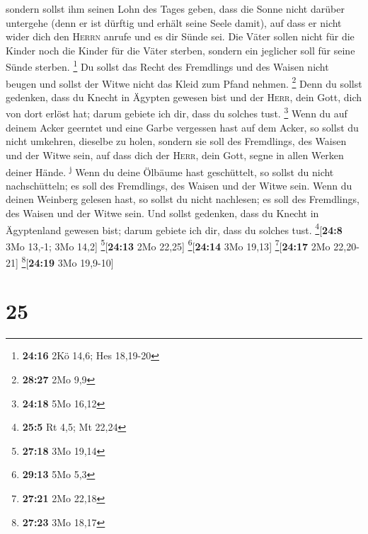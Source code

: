 sondern sollst ihm seinen Lohn des Tages geben, dass die
Sonne nicht darüber untergehe (denn er ist dürftig und erhält seine
Seele damit), auf dass er nicht wider dich den \textsc{Herrn} anrufe und
es dir Sünde sei.  Die Väter sollen nicht für die Kinder
noch die Kinder für die Väter sterben, sondern ein jeglicher soll für
seine Sünde sterben. \footnote{\textbf{24:16} 2Kö 14,6; Hes 18,19-20}
 Du sollst das Recht des Fremdlings und des Waisen nicht
beugen und sollst der Witwe nicht das Kleid zum Pfand nehmen.
\footnote{\textbf{28:27} 2Mo 9,9}  Denn du sollst
gedenken, dass du Knecht in Ägypten gewesen bist und der \textsc{Herr},
dein Gott, dich von dort erlöst hat; darum gebiete ich dir, dass du
solches tust. \footnote{\textbf{24:18} 5Mo 16,12}  Wenn
du auf deinem Acker geerntet und eine Garbe vergessen hast auf dem
Acker, so sollst du nicht umkehren, dieselbe zu holen, sondern sie soll
des Fremdlings, des Waisen und der Witwe sein, auf dass dich der
\textsc{Herr}, dein Gott, segne in allen Werken deiner Hände.
\textsuperscript{j}  Wenn du deine Ölbäume hast
geschüttelt, so sollst du nicht nachschütteln; es soll des Fremdlings,
des Waisen und der Witwe sein.  Wenn du deinen Weinberg
gelesen hast, so sollst du nicht nachlesen; es soll des Fremdlings, des
Waisen und der Witwe sein.  Und sollst gedenken, dass du
Knecht in Ägyptenland gewesen bist; darum gebiete ich dir, dass du
solches tust. \footnote{\textbf{25:5} Rt 4,5; Mt 22,24}{[}\textbf{24:8}
3Mo 13,-1; 3Mo 14,2{]} \footnote{\textbf{27:18} 3Mo 19,14}{[}\textbf{24:13}
2Mo 22,25{]} \footnote{\textbf{29:13} 5Mo 5,3}{[}\textbf{24:14} 3Mo
19,13{]} \footnote{\textbf{27:21} 2Mo 22,18}{[}\textbf{24:17} 2Mo
22,20-21{]} \footnote{\textbf{27:23} 3Mo 18,17}{[}\textbf{24:19} 3Mo
19,9-10{]}

\hypertarget{section-24}{%
\section{25}\label{section-24}}

